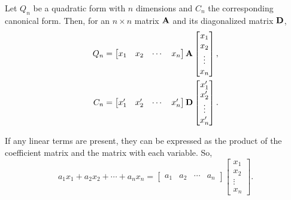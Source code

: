 \begin{theorem}
Let $Q_n$ be a quadratic form with $n$ dimensions and $C_n$ the corresponding canonical form. Then, for an $n \times n$ matrix $\bold{A}$ and its diagonalized matrix $\bold{D}$,
    \begin{align*}
        Q_n &= \begin{bmatrix} x_1 & x_2 & \cdots & x_n \end{bmatrix} \bold{A} \begin{bmatrix} x_1 \\ x_2 \\ \vdots \\ x_n\end{bmatrix}, \\
    C_n &= \begin{bmatrix} x_1' & x_2' & \cdots & x_n' \end{bmatrix} \bold{D} \begin{bmatrix} x_1' \\ x_2' \\ \vdots \\ x_n'\end{bmatrix}.
    \end{align*}
\end{theorem}
If any linear terms are present, they can be expressed as the product of the coefficient matrix and the
matrix with each variable. So, $$a_1x_1+a_2x_2+\cdots+a_nx_n = \begin{bmatrix}a_1 & a_2 & \cdots & a_n \end{bmatrix}
\begin{bmatrix} x_1 \\ x_2 \\ \vdots \\ x_n \end{bmatrix}.$$

\begin{exercise}

\end{exercise}
